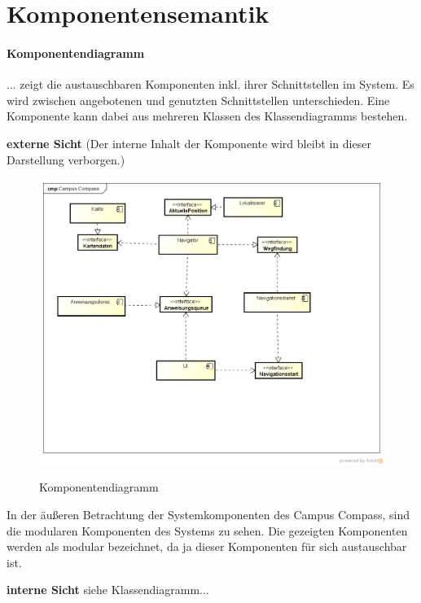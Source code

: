 \chapter{Komponentensemantik}

\subsubsection*{Komponentendiagramm}
... zeigt die austauschbaren Komponenten inkl. ihrer Schnittstellen im System. Es wird zwischen angebotenen und genutzten Schnittstellen unterschieden. Eine Komponente kann dabei aus mehreren Klassen des Klassendiagramms bestehen.

\textbf{externe Sicht}
(Der interne Inhalt der Komponente wird bleibt in dieser Darstellung verborgen.)
\begin{figure}[hbt]
  \centering
  \includegraphics[width=\linewidth]{img/komponentendiagramm.png}
  \label{img:komponentendiagramm}
  \caption{Komponentendiagramm}
\end{figure}

\noindent In der äußeren Betrachtung der Systemkomponenten des Campus Compass, sind die modularen Komponenten des Systems zu sehen. Die gezeigten Komponenten werden als modular bezeichnet, da ja dieser Komponenten für sich austauschbar ist.

\textbf{interne Sicht}
siehe Klassendiagramm...